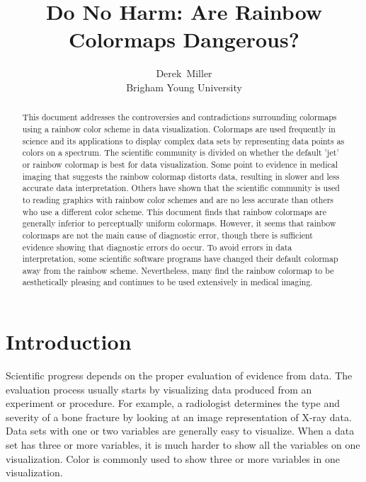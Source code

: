 \documentclass[journal]{IEEEtran}
\title{Do No Harm: Are Rainbow Colormaps Dangerous? \\}
\author{Derek~Miller \\ Brigham Young University}%
\begin{document}
\begin{titlepage}
\maketitle
\thispagestyle{empty}

\begin{abstract}
This document addresses the controversies and contradictions
surrounding colormaps using a rainbow color scheme in data visualization.
Colormaps are used frequently in science and its applications
to display complex data sets by
representing data points as colors on a spectrum. The scientific
community is divided on whether the default 'jet' or rainbow colormap
is best for data visualization. Some point to evidence in medical imaging
that suggests the rainbow colormap distorts data, resulting in slower and 
less accurate data interpretation. Others have shown that the
scientific community is used to reading graphics with rainbow
color schemes and are no less accurate than others who use
a different color scheme. This document finds that rainbow colormaps
are generally inferior to perceptually uniform colormaps. However, it
seems that rainbow colormaps are not the main cause of diagnostic error,
though there is sufficient evidence showing that diagnostic errors do occur.
To avoid errors in data interpretation, some scientific software programs
have changed their default colormap away from the rainbow scheme.
Nevertheless, many find the rainbow colormap to be aesthetically pleasing
and continues to be used extensively in medical imaging.
\end{abstract}
\tableofcontents
\vspace*{\fill}
\end{titlepage}

\IEEEpeerreviewmaketitle

\section{Introduction}
Scientific progress depends on the proper evaluation
of evidence from data. The evaluation process usually
starts by visualizing data produced from an experiment
or procedure. For example, a radiologist determines the
type and severity of a bone fracture by looking at an
image representation of X-ray data.
Data sets with one or two variables are generally easy to visualize. 
When a data set has three or more variables, it is much harder to show all the variables
on one visualization. Color is commonly used to show three or more variables in one visualization.
\end{document}
